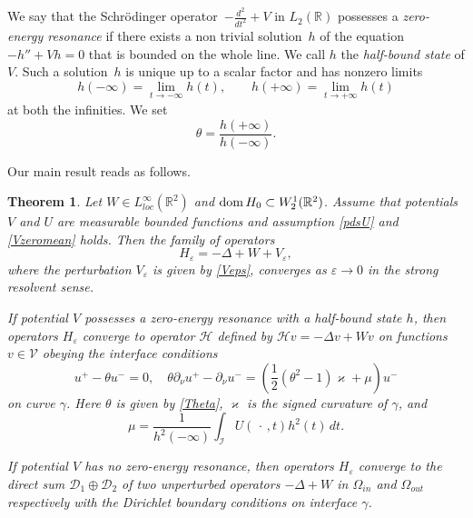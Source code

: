 \documentclass[reqno]{amsart}
\theoremstyle{plain}
\newtheorem{thm}{Theorem}
\numberwithin{equation}{section}
\newcommand{\dom}{\mathop{\rm dom}}
\renewcommand{\kappa}{\varkappa}
\newcommand{\Real}{\mathbb R}
\newcommand{\eps}{\varepsilon}
\newcommand{\cI}{\mathcal{I}}
\renewcommand{\emph}[1]{{\textit{#1}}}
\begin{document}
We say that the Schr\"odinger operator~$-\frac{d^2}{d t^2}+V$ in $L_2(\Real)$ possesses a \emph{zero-energy resonance}  if there exists a non trivial solution~$h$ of the equation $-h'' +Vh= 0$ that is bounded on the whole line.  We call $h$ the \emph{half-bound state} of $V$.  Such a solution~$h$ is  unique up to a scalar factor and has nonzero limits
\begin{equation*}
  h(-\infty)=\lim\limits_{t\to-\infty}h(t), \qquad
  h(+\infty)=\lim\limits_{t\to+\infty}h(t)
\end{equation*}
at both the infinities. We set
\begin{equation}\label{Theta}
  \theta=\frac{h(+\infty)}{h(-\infty)}.
\end{equation}



Our main result reads as follows.


\begin{thm}\label{MainThrm}
Let $W\in L^\infty_{loc}(\Real^2)$ and  $\dom H_0\subset W_2^1(\Real^2)$.
Assume  that potentials $V$ and $U$  are measurable bounded functions and assumption \eqref{pdsU} and \eqref{Vzeromean}  holds.
Then the family of operators
\begin{equation*}
 H_\eps=-\Delta +W+V_\eps,
\end{equation*}
where the perturbation $V_\eps$ is given by \eqref{Veps},
converges as $\eps\to 0$ in the strong resolvent sense.

If potential $V$ possesses a zero-energy resonance with a half-bound state $h$, then operators $H_\eps$ converge to  operator $\mathcal{H}$
defined by
$
\mathcal{H} v=-\Delta v+Wv
$
on functions $v\in \mathcal{V}$  obeying the interface conditions
\begin{equation}\label{ConnectedCond}
 u^+-\theta u^-=0,\quad  \theta\partial_\nu u^+-\partial_\nu u^-
=\left(\textstyle\frac{1}{2 }(\theta^2-1)\kappa+\mu\right) u^-
\end{equation}
on curve $\gamma$. Here  $\theta$ is given by  \eqref{Theta},  $\kappa$ is the signed curvature of $\gamma$, and
\begin{equation}\label{Mu}
  \mu=\frac{1}{h^2(-\infty)} \int_{\cI} U(\,\cdot\,,t)h^2(t)\, dt.
\end{equation}


If potential $V$ has no zero-energy resonance, then operators $H_\eps$ converge to the direct sum $\mathcal{D}_1\oplus\mathcal{D}_2$ of two unperturbed operators $-\Delta +W$ in $\Omega_{in}$ and $\Omega_{out}$ respectively with the Dirichlet boundary conditions on interface $\gamma$.
\end{thm}
\end{document}
